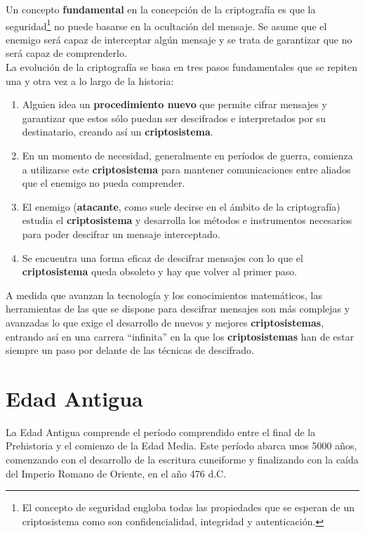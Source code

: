 \documentclass[nochap]{apuntesURJC}
\begin{document}
Un concepto \textbf{fundamental} en la concepción de la criptografía es que la seguridad\footnote{El concepto de seguridad engloba todas las propiedades que se esperan de un criptosistema como son confidencialidad, integridad y autenticación.} no puede basarse en la ocultación del mensaje. Se asume que el enemigo será capaz de interceptar algún mensaje y se trata de garantizar que no será capaz de comprenderlo.\\

La evolución de la criptografía se basa en tres pasos fundamentales que se repiten una y otra vez a lo largo de la historia:
\begin{enumerate}
\item Alguien idea un \textbf{procedimiento nuevo} que permite cifrar mensajes y garantizar que estos sólo puedan ser descifrados e interpretados por su destinatario, creando así un \textbf{criptosistema}.

\item En un momento de necesidad, generalmente en períodos de guerra, comienza a utilizarse este \textbf{criptosistema} para mantener comunicaciones entre aliados que el enemigo no pueda comprender.

\item El enemigo (\textbf{atacante}, como suele decirse en el ámbito de la criptografía) estudia el \textbf{criptosistema} y desarrolla los métodos e instrumentos necesarios para poder descifrar un mensaje interceptado.

\item Se encuentra una forma eficaz de descifrar mensajes con lo que el \textbf{criptosistema} queda obsoleto y hay que volver al primer paso.
\end{enumerate}

A medida que avanzan la tecnología y los conocimientos matemáticos, las herramientas de las que se dispone para descifrar mensajes son más complejas y avanzadas lo que exige el desarrollo de nuevos y mejores \textbf{criptosistemas}, entrando así en una carrera ``infinita'' en la que los \textbf{criptosistemas} han de estar siempre un paso por delante de las técnicas de descifrado.\\

\section{Edad Antigua}

La Edad Antigua comprende el período comprendido entre el final de la Prehistoria y el comienzo de la Edad Media. Este período abarca unos 5000 años, comenzando con el desarrollo de la escritura cuneiforme y finalizando con la caída del Imperio Romano de Oriente, en el año 476 d.C.
\end{document}
